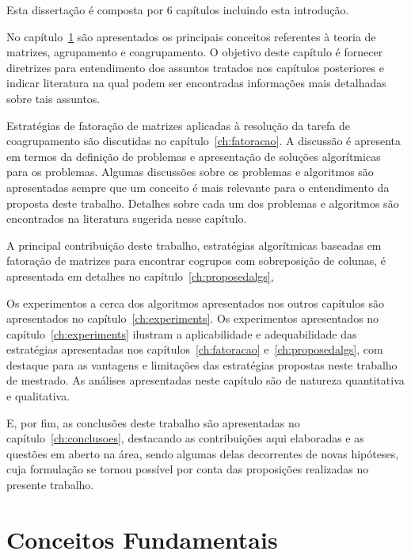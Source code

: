 \documentclass[
    12pt,                %
    oneside,            %
    a4paper,            %
    english,            %
    brazil                %
    ]{abntex2ppgsi}
\begin{document}
Esta dissertação é composta por $6$ capítulos incluindo esta introdução.

No capítulo~\ref{ch:conceitos} são apresentados os principais conceitos referentes à teoria de matrizes, agrupamento e coagrupamento.
O objetivo deste capítulo é fornecer diretrizes para entendimento dos assuntos tratados nos capítulos posteriores e indicar literatura na qual podem ser encontradas informações mais detalhadas sobre tais assuntos.

Estratégias de fatoração de matrizes aplicadas à resolução da tarefa de coagrupamento são discutidas no capítulo~\ref{ch:fatoracao}.
A discussão é apresenta em termos da definição de problemas e apresentação de soluções algorítmicas para os problemas.
Algumas discussões sobre os problemas e algoritmos são apresentadas sempre que um conceito é mais relevante para o entendimento da proposta deste trabalho.
Detalhes sobre cada um dos problemas e algoritmos são encontrados na literatura sugerida nesse capítulo.

A principal contribuição deste trabalho, estratégias algorítmicas baseadas em fatoração de matrizes para encontrar cogrupos com sobreposição de colunas, é apresentada em detalhes no capítulo~\ref{ch:proposedalgs},

Os experimentos a cerca dos algoritmos apresentados nos outros capítulos são apresentados no capítulo~\ref{ch:experiments}.
Os experimentos apresentados no capítulo~\ref{ch:experiments} ilustram a aplicabilidade e adequabilidade das estratégias apresentadas nos capítulos~\ref{ch:fatoracao} e~\ref{ch:proposedalgs}, com destaque para as vantagens e limitações das estratégias propostas neste trabalho de mestrado.
As análises apresentadas neste capítulo são de natureza quantitativa e qualitativa.

E, por fim, as conclusões deste trabalho são apresentadas no capítulo~\ref{ch:conclusoes}, destacando as contribuições aqui elaboradas e as questões em aberto na área, sendo algumas delas decorrentes de novas hipóteses, cuja formulação se tornou possível por conta das proposições realizadas no presente trabalho.


\chapter{Conceitos Fundamentais}
\label{ch:conceitos}
\end{document}
